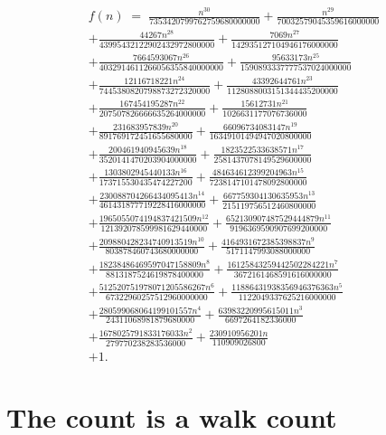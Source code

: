\documentclass[11pt,a4paper]{article}
\theoremstyle{plain}
\theoremstyle{definition}
\begin{document}
\begin{multline*}
f(n)\;=\;\frac{n^{30}}{7353420799762759680000000} + \frac{n^{29}}{70032579045359616000000} \\
+ \frac{44267 n^{28}}{43995432122902432972800000} + \frac{7069 n^{27}}{142935127104946176000000} \\
+ \frac{7664593067 n^{26}}{4032914611266056355840000000} + \frac{95633173 n^{25}}{1590893337777537024000000} \\
+ \frac{12116718221 n^{24}}{7445380820798873272320000} + \frac{43392644761 n^{23}}{1128088003151344435200000} \\
+ \frac{167454195287 n^{22}}{207507826666635264000000} + \frac{15612731 n^{21}}{1026631177076736000} \\
+ \frac{231683957839 n^{20}}{891769172451655680000} + \frac{66096734083147 n^{19}}{16349101494947020800000} \\
+ \frac{200461940945639 n^{18}}{3520141470203904000000} + \frac{1823522533638571 n^{17}}{2581437078149529600000} \\
+ \frac{1303802945440133 n^{16}}{173715530435474227200} + \frac{484634612399204963 n^{15}}{7238147101478092800000} \\
+ \frac{230088704266434095413 n^{14}}{461431877719228416000000} + \frac{667759304130635953 n^{13}}{215119756512460800000} \\
+ \frac{1965055074194837421509 n^{12}}{121392078599981629440000} + \frac{652130907487529444879 n^{11}}{9196369590907699200000} \\
+ \frac{209880428234740913519 n^{10}}{803878460743680000000} + \frac{4164931672385398837 n^{9}}{5171147993088000000} \\
+ \frac{18238486469597047158809 n^{8}}{8813187524619878400000} + \frac{16125843259442502284221 n^{7}}{3672161468591616000000} \\
+ \frac{512520751978071205586267 n^{6}}{67322960257512960000000} + \frac{11886431938356946376363 n^{5}}{1122049337625216000000} \\
+ \frac{280599068064199101557 n^{4}}{24311068981879680000} + \frac{63983220995615011 n^{3}}{6697264182336000} \\
+ \frac{1678025791833176033 n^{2}}{279770238283536000} + \frac{230910956201 n}{110909026800} \\
+ 1.
\end{multline*}

\section{The count is a walk count}
\end{document}
